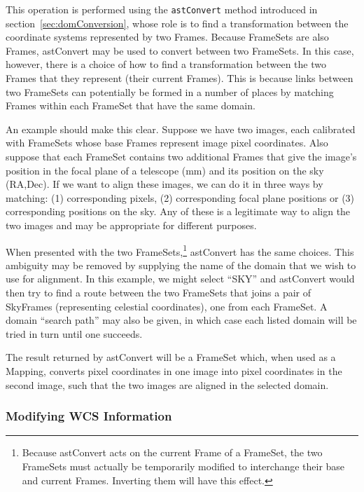 \documentclass[final,authoryear,5p,times,twocolumn]{elsarticle}
\begin{document}
This operation is performed using the \texttt{astConvert} method introduced in
section~\ref{sec:domConversion}, whose role is to find a transformation
between the coordinate systems represented by two Frames. Because
FrameSets are also Frames, astConvert may be used to convert between two
FrameSets. In this case, however, there is a choice of how to find a
transformation between the two Frames that they represent (their current
Frames). This is because links between two FrameSets can potentially be
formed in a number of places by matching Frames within each FrameSet that
have the same domain.

An example should make this clear. Suppose we have two images, each
calibrated with FrameSets whose base Frames represent image pixel
coordinates. Also suppose that each FrameSet contains two additional
Frames that give the image's position in the focal plane of a telescope
(mm) and its position on the sky (RA,Dec). If we want to align these
images, we can do it in three ways by matching: (1) corresponding pixels,
(2) corresponding focal plane positions or (3) corresponding positions on
the sky. Any of these is a legitimate way to align the two images and may
be appropriate for different purposes.

When presented with the two FrameSets,\footnote{Because astConvert acts
on the current Frame of a FrameSet, the two FrameSets must actually be
temporarily modified to interchange their base and current Frames.
Inverting them will have this effect.} astConvert has the same
choices. This ambiguity may be removed by supplying the name of the
domain that we wish to use for alignment. In this example, we might
select ``SKY'' and astConvert would then try to find a route between the
two FrameSets that joins a pair of SkyFrames (representing celestial
coordinates), one from each FrameSet. A domain ``search path'' may also be
given, in which case each listed domain will be tried in turn until one
succeeds.

The result returned by astConvert will be a FrameSet which, when used as
a Mapping, converts pixel coordinates in one image into pixel coordinates
in the second image, such that the two images are aligned in the selected
domain.

\subsubsection{Modifying WCS Information}
\end{document}
